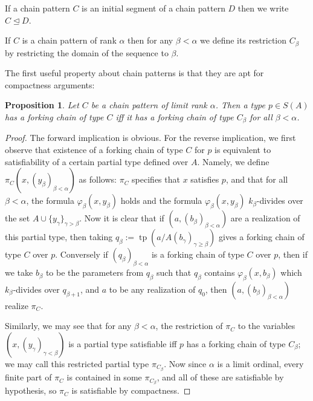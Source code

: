 \documentclass{article}
\DeclareMathOperator{\tp}{tp}
\newtheorem{prop}[theorem]{Proposition}
\theoremstyle{remark}
\theoremstyle{definition}
\begin{document}
If a chain pattern $C$ is an initial segment of a chain pattern $D$ then we write $C\trianglelefteq D$.

If $C$ is a chain pattern of rank $\alpha$ then for any $\beta<\alpha$ we define its restriction $C_\beta$ by restricting the domain of the sequence to $\beta$.

The first useful property about chain patterns is that they are apt for compactness arguments:
\begin{prop}\label{LimitChains}
    Let $C$ be a chain pattern of limit rank $\alpha$. Then a type $p\in S(A)$ has a forking chain of type $C$ iff it has a forking chain of type $C_\beta$ for all $\beta<\alpha$.
\end{prop}
\begin{proof}
    The forward implication is obvious. For the reverse implication, we first observe that existence of a forking chain of type $C$ for $p$ is equivalent to satisfiability of a certain partial type defined over $A$. Namely, we define $\pi_C(x, (y_\beta)_{\beta<\alpha})$ as follows: $\pi_C$ specifies that $x$ satisfies $p$, and that for all $\beta<\alpha$, the formula $\varphi_\beta(x,y_\beta)$ holds and the formula $\varphi_\beta(x,y_\beta)$ $k_\beta$-divides over the set $A\cup\{y_\gamma\}_{\gamma>\beta}$. Now it is clear that if $(a,(b_\beta)_{\beta<\alpha})$ are a realization of this partial type, then taking $q_\beta:=\tp(a/A(b_\gamma)_{\gamma\geq \beta})$ gives a forking chain of type $C$ over $p$. Conversely if $(q_\beta)_{\beta<\alpha}$ is a forking chain of type $C$ over $p$, then if we take $b_\beta$ to be the parameters from $q_\beta$ such that $q_\beta$ contains $\varphi_\beta(x,b_\beta)$ which $k_\beta$-divides over $q_{\beta+1}$, and $a$ to be any realization of $q_0$, then $(a,(b_\beta)_{\beta<\alpha})$ realize $\pi_C$.

    Similarly, we may see that for any $\beta<\alpha$, the restriction of $\pi_C$ to the variables $(x,(y_\gamma)_{\gamma<\beta})$ is a partial type satisfiable iff $p$ has a forking chain of type $C_\beta$; we may call this restricted partial type $\pi_{C_\beta}$. Now since $\alpha$ is a limit ordinal, every finite part of $\pi_C$ is contained in some $\pi_{C_\beta}$, and all of these are satisfiable by hypothesis, so $\pi_C$ is satisfiable by compactness.
\end{proof}
\end{document}
